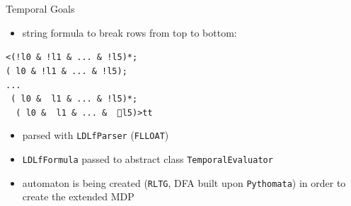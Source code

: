\begin{frame}{Temporal Goals}
    \begin{itemize}
        \item string formula to break rows from top to bottom:
    \end{itemize}
        \begin{center}
            \texttt{<(!l0 \& !l1 \& ... \& !l5)*;\\
                    ( l0 \& !l1 \& ... \& !l5); \\
                    ...\\
                   ~( l0 \& ~l1 \& ... \& !l5)*;\\
                  ~~( l0 \& ~l1 \& ... \& ~􏰂l5)>tt}
        \end{center}
    \begin{itemize}
        \item parsed with \texttt{LDLfParser} (\texttt{FLLOAT})
        \item \texttt{LDLfFormula} passed to abstract class \texttt{TemporalEvaluator}
        \item automaton is being created (\texttt{RLTG}, DFA built upon
            \texttt{Pythomata}) in order to create the extended MDP
    \end{itemize}
\end{frame}
